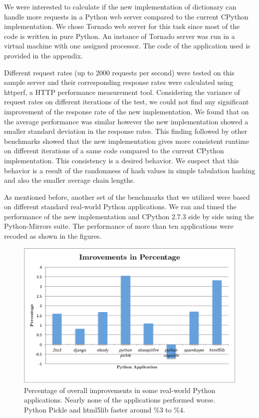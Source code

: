 \documentclass[11pt]{article}
\begin{document}
We were interested to calculate if the new implementation of dictionary can handle more requests in a Python web server compared to the current CPython implementation. We chose Tornado web server for this task since most of the code is written in pure Python. An instance of Tornado server was run in a virtual machine with one assigned processor. The code of the application used is provided in the appendix. 

Different request rates (up to 2000 requests per second) were tested on this
sample server and their corresponding response rates were calculated using
httperf, a HTTP performance measurement tool. Considering the variance of request rates on different iterations of the test, we could not find any significant improvement of the response rate of the new implementation. We found that on the average performance was similar however the new implementation showed a smaller standard deviation in the response rates. This finding followed by other benchmarks showed that the new implementation gives more consistent runtime on different iterations of a same code compared to the current CPython implementation. This consistency is a desired behavior. We suspect that this behavior is a result of the randomness of hash values in simple tabulation hashing and also the smaller average chain lengths.

As mentioned before, another set of the benchmarks that we utilized were based on different standard real-world Python applications. We ran and timed the performance of the new implementation and CPython 2.7.3 side by side using the Python-Mirrors suite. The performance of more than ten applications were recoded as shown in the figures.

\begin{figure}[H]
  \centering
  \includegraphics[width=12cm]{appsbench.pdf}
  \caption{Percentage of overall improvements in some real-world Python applications. Nearly none of the applications performed worse. Python Pickle and html5lib faster around \%3 to \%4. }
\end{figure}
\end{document}
